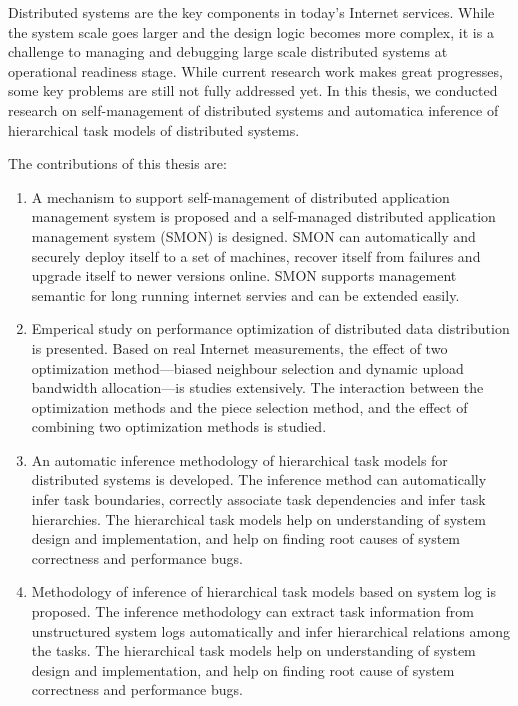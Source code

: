 \begin{eabstract}

  Distributed systems are the key components in today's Internet
  services. While the system scale goes larger and the design logic
  becomes more complex, it is a challenge to managing and debugging
  large scale distributed systems at operational readiness stage.
  While current research work makes great progresses, some key
  problems are still not fully addressed yet. In this thesis, we
  conducted research on self-management of distributed systems and
  automatica inference of hierarchical task models of distributed
  systems.

  The contributions of this thesis are:

  \begin{enumerate}

    \item A mechanism to support self-management of distributed
    application management system is proposed and a self-managed
    distributed application management system (SMON) is designed. SMON
    can automatically and securely deploy itself to a set of machines,
    recover itself from failures and upgrade itself to newer versions
    online. SMON supports management semantic for long running
    internet servies and can be extended easily.

    \item Emperical study on performance optimization of distributed
    data distribution is presented. Based on real Internet
    measurements, the effect of two optimization method---biased
    neighbour selection and dynamic upload bandwidth allocation---is
    studies extensively. The interaction between the optimization
    methods and the piece selection method, and the effect of
    combining two optimization methods is studied.

    \item An automatic inference methodology of hierarchical task
    models for distributed systems is developed. The inference method
    can automatically infer task boundaries, correctly associate task
    dependencies and infer task hierarchies.  The hierarchical task
    models help on understanding of system design and implementation,
    and help on finding root causes of system correctness and
    performance bugs.

    \item Methodology of inference of hierarchical task models based
    on system log is proposed. The inference methodology can extract
    task information from unstructured system logs automatically and
    infer hierarchical relations among the tasks. The hierarchical
    task models help on understanding of system design and
    implementation, and help on finding root cause of system
    correctness and performance bugs.

  \end{enumerate}

\end{eabstract}

